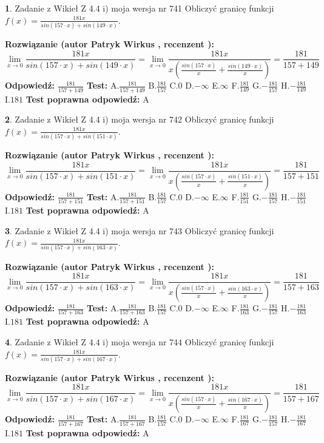 \documentclass[12pt, a4paper]{article}
\theoremstyle{definition} %
\newtheorem{zad}{}
\newcommand{\zadStart}[1]{\begin{zad}#1\newline}
\newcommand{\zadStop}{\end{zad}}
\newcommand{\rozwStart}[2]{\noindent \textbf{Rozwiązanie (autor #1 , recenzent #2): }\newline}
\newcommand{\rozwStop}{\newline}
\newcommand{\odpStart}{\noindent \textbf{Odpowiedź:}\newline}
\newcommand{\odpStop}{\newline}
\newcommand{\testStart}{\noindent \textbf{Test:}\newline}
\newcommand{\testStop}{\newline}
\newcommand{\kluczStart}{\noindent \textbf{Test poprawna odpowiedź:}\newline}
\newcommand{\kluczStop}{\newline}
\begin{document}
\zadStart{Zadanie z Wikieł Z 4.4 i) moja wersja nr 741}
Obliczyć granicę funkcji $f(x)=\frac{181x}{sin(157\cdot x) +sin(149\cdot x)}$.
\zadStop
\rozwStart{Patryk Wirkus}{}
$$\lim\limits_{x\to 0}\frac{181x}{sin(157\cdot x) +sin(149\cdot x)}=\lim\limits_{x\to 0}\frac{181x}{x(\frac{sin(157\cdot x)}{x}+\frac{sin(149\cdot x)}{x})}=\frac{181}{157+149}$$
\rozwStop
\odpStart
$\frac{181}{157+149}$
\odpStop
\testStart
A.$\frac{181}{157+149}$
B.$\frac{181}{157}$
C.$0$
D.$-\infty$
E.$\infty$
F.$\frac{181}{149}$
G.$-\frac{181}{157}$
H.$-\frac{181}{149}$
I.$181$
\testStop
\kluczStart
A
\kluczStop



\zadStart{Zadanie z Wikieł Z 4.4 i) moja wersja nr 742}
Obliczyć granicę funkcji $f(x)=\frac{181x}{sin(157\cdot x) +sin(151\cdot x)}$.
\zadStop
\rozwStart{Patryk Wirkus}{}
$$\lim\limits_{x\to 0}\frac{181x}{sin(157\cdot x) +sin(151\cdot x)}=\lim\limits_{x\to 0}\frac{181x}{x(\frac{sin(157\cdot x)}{x}+\frac{sin(151\cdot x)}{x})}=\frac{181}{157+151}$$
\rozwStop
\odpStart
$\frac{181}{157+151}$
\odpStop
\testStart
A.$\frac{181}{157+151}$
B.$\frac{181}{157}$
C.$0$
D.$-\infty$
E.$\infty$
F.$\frac{181}{151}$
G.$-\frac{181}{157}$
H.$-\frac{181}{151}$
I.$181$
\testStop
\kluczStart
A
\kluczStop



\zadStart{Zadanie z Wikieł Z 4.4 i) moja wersja nr 743}
Obliczyć granicę funkcji $f(x)=\frac{181x}{sin(157\cdot x) +sin(163\cdot x)}$.
\zadStop
\rozwStart{Patryk Wirkus}{}
$$\lim\limits_{x\to 0}\frac{181x}{sin(157\cdot x) +sin(163\cdot x)}=\lim\limits_{x\to 0}\frac{181x}{x(\frac{sin(157\cdot x)}{x}+\frac{sin(163\cdot x)}{x})}=\frac{181}{157+163}$$
\rozwStop
\odpStart
$\frac{181}{157+163}$
\odpStop
\testStart
A.$\frac{181}{157+163}$
B.$\frac{181}{157}$
C.$0$
D.$-\infty$
E.$\infty$
F.$\frac{181}{163}$
G.$-\frac{181}{157}$
H.$-\frac{181}{163}$
I.$181$
\testStop
\kluczStart
A
\kluczStop



\zadStart{Zadanie z Wikieł Z 4.4 i) moja wersja nr 744}
Obliczyć granicę funkcji $f(x)=\frac{181x}{sin(157\cdot x) +sin(167\cdot x)}$.
\zadStop
\rozwStart{Patryk Wirkus}{}
$$\lim\limits_{x\to 0}\frac{181x}{sin(157\cdot x) +sin(167\cdot x)}=\lim\limits_{x\to 0}\frac{181x}{x(\frac{sin(157\cdot x)}{x}+\frac{sin(167\cdot x)}{x})}=\frac{181}{157+167}$$
\rozwStop
\odpStart
$\frac{181}{157+167}$
\odpStop
\testStart
A.$\frac{181}{157+167}$
B.$\frac{181}{157}$
C.$0$
D.$-\infty$
E.$\infty$
F.$\frac{181}{167}$
G.$-\frac{181}{157}$
H.$-\frac{181}{167}$
I.$181$
\testStop
\kluczStart
A
\kluczStop
\end{document}
